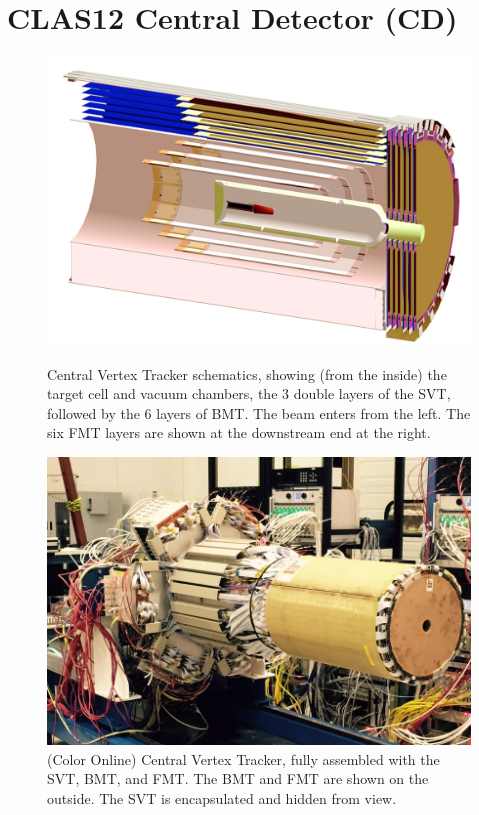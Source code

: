 \documentclass[final,3p,twocolumn]{elsarticle}
\begin{document}
\section{CLAS12 Central Detector (CD)} 
\begin{figure}[t!]
\centerline{\includegraphics[width=1.0\columnwidth]{CVT-schematics.png}}
\caption{ \rm Central Vertex Tracker schematics, showing (from the inside) the target cell and vacuum chambers, the 3 double layers of the SVT, followed by the 6 layers of BMT. The beam enters from the left.  The six FMT layers are shown at the downstream end at the 
right. }
\label{CVT}
\vspace{1.0cm}
\centerline{\includegraphics[width=1.0\columnwidth]{CVT.png}}
\caption{(Color Online) Central Vertex Tracker, fully assembled with the SVT, BMT, and FMT. The BMT and FMT are shown on the
outside. The SVT is encapsulated and hidden from view.}
\label{CVT}
\end{figure}
\end{document}
